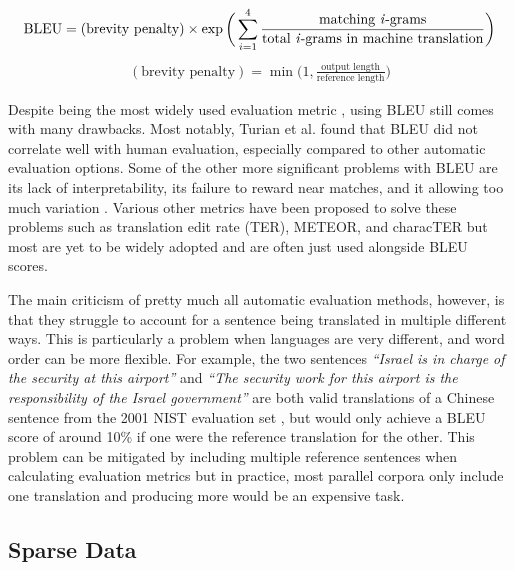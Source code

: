 \documentclass[11pt]{article}
\begin{document}
\begin{align}
    \textrm{BLEU} = (\textrm{brevity penalty}) \times \exp \bigg( \sum_{i=1}^4 \frac{\textrm{matching \textit{i}-grams}}{\textrm{total \textit{i}-grams in machine translation}} \bigg)
\end{align}
\begin{align}
    (\textrm{brevity penalty}) = \min\bigg(1, \frac{\textrm{output length}}{\textrm{reference length}}\bigg)
\end{align}

Despite being the most widely used evaluation metric \citep[ch. 4]{koehn2020}, using BLEU still comes with many drawbacks. Most notably, Turian et al. \citeyearpar{turian2006evaluation} found that BLEU did not correlate well with human evaluation, especially compared to other automatic evaluation options. Some of the other more significant problems with BLEU are its lack of interpretability, its failure to reward near matches, and it allowing too much variation \citep{ananthakrishnan2007some}. Various other metrics have been proposed to solve these problems such as translation edit rate (TER), METEOR, and characTER but most are yet to be widely adopted and are often just used alongside BLEU scores.

\bigskip

The main criticism of pretty much all automatic evaluation methods, however, is that they struggle to account for a sentence being translated in multiple different ways. This is particularly a problem when languages are very different, and word order can be more flexible. For example, the two sentences \textit{“Israel is in charge of the security at this airport”} and \textit{“The security work for this airport is the responsibility of the Israel government”} are both valid translations of a Chinese sentence from the 2001 NIST evaluation set \citep{koehn2011better}, but would only achieve a BLEU score of around 10\% if one were the reference translation for the other. This problem can be mitigated by including multiple reference sentences when calculating evaluation metrics but in practice, most parallel corpora only include one translation and producing more would be an expensive task.

\subsection{Sparse Data}
\end{document}
